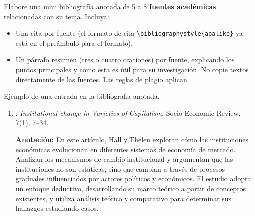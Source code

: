 \documentclass[11pt]{article}
\begin{document}
Elabore una mini bibliografía anotada de 5 a 8 \textbf{fuentes académicas} relacionadas con su tema. Incluya:
\begin{itemize}
    \item Una cita por fuente (el formato de cita \texttt{\textbackslash bibliographystyle\{apalike\}} ya está en el preámbulo para el formato).
    \item Un párrafo resumen (tres o cuatro oraciones) por fuente, explicando los puntos principales y cómo esta es útil para su investigación. No copie textos directamente de las fuentes. Las reglas de plagio aplican.
\end{itemize}

Ejemplo de una entrada en la bibliografía anotada.

\begin{enumerate}
  \item \citet{hall2009institutional}. \emph{Institutional change in Varieties of Capitalism}. Socio-Economic Review, 7(1), 7--34.

  \textbf{Anotación:} En este artículo, Hall y Thelen exploran cómo las instituciones económicas evolucionan en diferentes sistemas de economía de mercado. Analizan los mecanismos de cambio institucional y argumentan que las instituciones no son estáticas, sino que cambian a través de procesos graduales influenciados por actores políticos y económicos. El estudio adopta un enfoque deductivo, desarrollando su marco teórico a partir de conceptos existentes, y utiliza análisis teórico y comparativo para determinar sus hallazgos estudiando casos.
\end{enumerate}

\printbibliography[title={Bibliografía}, heading=subbibliography]
\end{document}
